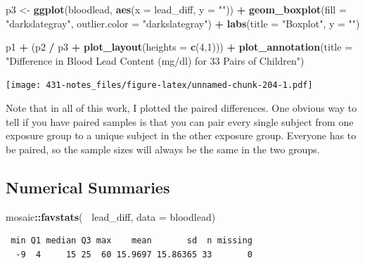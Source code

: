 \documentclass[
]{book}
\newenvironment{Shaded}{\begin{snugshade}}{\end{snugshade}}
\newcommand{\DataTypeTok}[1]{\textcolor[rgb]{0.13,0.29,0.53}{#1}}
\newcommand{\DecValTok}[1]{\textcolor[rgb]{0.00,0.00,0.81}{#1}}
\newcommand{\KeywordTok}[1]{\textcolor[rgb]{0.13,0.29,0.53}{\textbf{#1}}}
\newcommand{\NormalTok}[1]{#1}
\newcommand{\OperatorTok}[1]{\textcolor[rgb]{0.81,0.36,0.00}{\textbf{#1}}}
\newcommand{\StringTok}[1]{\textcolor[rgb]{0.31,0.60,0.02}{#1}}
\begin{document}
\begin{Shaded}
\begin{Highlighting}[]
\NormalTok{p3 <-}\StringTok{ }\KeywordTok{ggplot}\NormalTok{(bloodlead, }\KeywordTok{aes}\NormalTok{(}\DataTypeTok{x =}\NormalTok{ lead_diff, }\DataTypeTok{y =} \StringTok{""}\NormalTok{)) }\OperatorTok{+}
\StringTok{  }\KeywordTok{geom_boxplot}\NormalTok{(}\DataTypeTok{fill =} \StringTok{"darkslategray"}\NormalTok{, }\DataTypeTok{outlier.color =} \StringTok{"darkslategray"}\NormalTok{) }\OperatorTok{+}\StringTok{ }
\StringTok{  }\KeywordTok{labs}\NormalTok{(}\DataTypeTok{title =} \StringTok{"Boxplot"}\NormalTok{, }\DataTypeTok{y =} \StringTok{""}\NormalTok{)}

\NormalTok{p1 }\OperatorTok{+}\StringTok{ }\NormalTok{(p2 }\OperatorTok{/}\StringTok{ }\NormalTok{p3 }\OperatorTok{+}\StringTok{ }\KeywordTok{plot_layout}\NormalTok{(}\DataTypeTok{heights =} \KeywordTok{c}\NormalTok{(}\DecValTok{4}\NormalTok{,}\DecValTok{1}\NormalTok{))) }\OperatorTok{+}\StringTok{ }
\StringTok{    }\KeywordTok{plot_annotation}\NormalTok{(}\DataTypeTok{title =} \StringTok{"Difference in Blood Lead Content (mg/dl) for 33 Pairs of Children"}\NormalTok{)}
\end{Highlighting}
\end{Shaded}

\texttt{[image: 431-notes\_files/figure-latex/unnamed-chunk-204-1.pdf]}

Note that in all of this work, I plotted the paired differences. One obvious way to tell if you have paired samples is that you can pair every single subject from one exposure group to a unique subject in the other exposure group. Everyone has to be paired, so the sample sizes will always be the same in the two groups.

\hypertarget{numerical-summaries}{%
\subsection{Numerical Summaries}\label{numerical-summaries}}

\begin{Shaded}
\begin{Highlighting}[]
\NormalTok{mosaic}\OperatorTok{::}\KeywordTok{favstats}\NormalTok{(}\OperatorTok{~}\StringTok{ }\NormalTok{lead_diff, }\DataTypeTok{data =}\NormalTok{ bloodlead)}
\end{Highlighting}
\end{Shaded}

\begin{verbatim}
 min Q1 median Q3 max    mean       sd  n missing
  -9  4     15 25  60 15.9697 15.86365 33       0
\end{verbatim}
\end{document}
